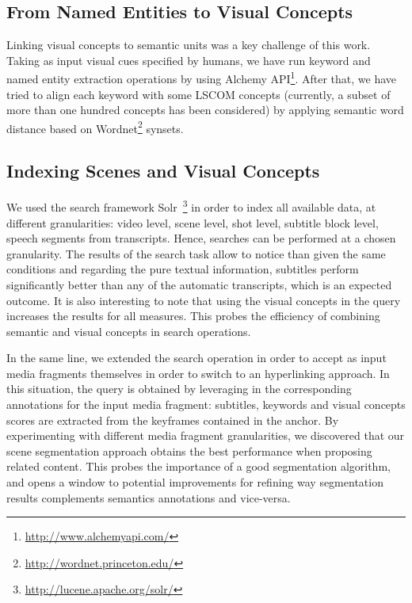 \documentclass[a4paper,11pt]{report}
\begin{document}
\subsection{From Named Entities to Visual Concepts}
Linking visual concepts to semantic units was a key challenge of this work. Taking as input visual cues specified by humans, we have run keyword and named entity extraction operations by using Alchemy API\footnote{\url{http://www.alchemyapi.com/}}. After that, we have tried to align each keyword with some LSCOM concepts (currently, a subset of more than one hundred concepts has been considered) by applying semantic word distance based on Wordnet\footnote{\url{http://wordnet.princeton.edu/}} synsets.

\subsection{Indexing Scenes and Visual Concepts}
We used the search framework Solr~\footnote{\url{http://lucene.apache.org/solr/}} in order to index all available data, at different granularities: video level, scene level, shot level, subtitle block level, speech segments from transcripts. Hence, searches can be performed at a chosen granularity. The results of the search task allow to notice than given the same conditions and regarding the pure textual information, subtitles perform significantly better than any of the automatic transcripts, which is an expected outcome. It is also interesting to note that using the visual concepts in the query increases the results for all measures. This probes the efficiency of combining semantic and visual concepts in search operations.

In the same line, we extended the search operation in order to accept as input media fragments themselves in order to switch to an hyperlinking approach. In this situation, the query is obtained by leveraging in the corresponding annotations for the input media fragment: subtitles, keywords and visual concepts scores are extracted from the keyframes contained in the anchor. By experimenting with different media fragment granularities, we discovered that our scene segmentation approach obtains the best performance when proposing related content. This probes the importance of a good segmentation algorithm, and opens a window to potential improvements for refining way segmentation results complements semantics annotations and vice-versa.
\end{document}
